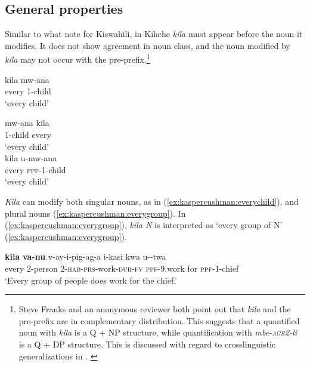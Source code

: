 \documentclass[letterpaper, 12pt]{article}
\begin{document}
\subsection{General properties}

Similar to what \citealt{zerbian08} note for Kiswahili, in Kihehe \textit{kila} must appear before the noun it modifies. It does not show agreement in noun class, and the noun modified by \textit{kila} may not occur with the pre-prefix.\footnote{Steve
    Franks and an anonymous reviewer both point out that \textit{kila} and the pre-prefix are in complementary distribution.  This suggests that a quantified noun with \textit{kila} is a Q + NP structure, while quantification with \textit{mbe-\textsc{agr2}-li} is a Q + DP structure. This is discussed with regard to crosslinguistic generalizations in . \label{foot:kaspercushman:1}
}

\begin{exe} 
\ex \begin{xlist}
\ex \gll kila mw-ana \\ 
every 1-child \\
`every child' \\ \label{ex:kaspercushman:everychild} 

\ex \gll * mw-ana kila \\
{} 1-child every \\
`every child' \\


\ex \gll * kila u-mw-ana \label{ex:kaspercushman:everyppfn}\\
{} every \textsc{ppf}-1-child \\
`every child'


\end{xlist}
\end{exe} 

\textit{Kila} can modify both singular nouns, as in (\ref{ex:kaspercushman:everychild}), and plural nouns (\ref{ex:kaspercushman:everygroup}). In (\ref{ex:kaspercushman:everygroup}), \textit{kila N} is interpreted as `every group of N' (\ref{ex:kaspercushman:everygroup}).   


\begin{exe}

\ex \gll \textbf{kila} \textbf{va-nu} v-ay-i-pig-ag-a i-kasi kwa u--twa \\
every 2-person 2-\textsc{hab}-\textsc{prs}-work-\textsc{dur}-\textsc{fv} \textsc{ppf}-9.work for \textsc{ppf}-1-chief \\
`Every group of people does work for the chief.' \label{ex:kaspercushman:everygroup}

\end{exe}
\end{document}

